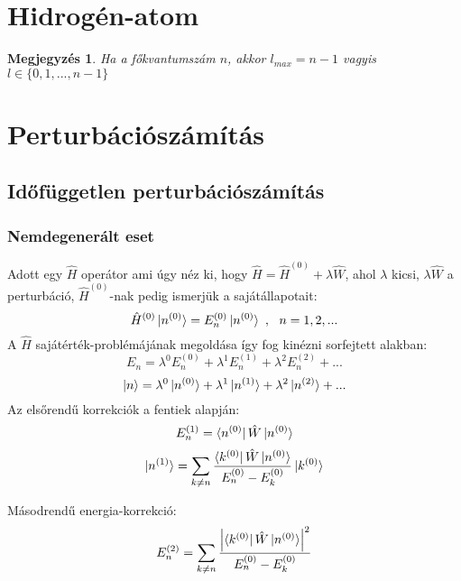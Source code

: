 \documentclass[12pt]{article}
\theoremstyle{plain}
\newtheorem*{megj}{Megjegyzés}
\begin{document}
\section{Hidrogén-atom}
\begin{megj}
    Ha a főkvantumszám $n$, akkor $l_{max}=n-1$ vagyis $l \in \{0,1,...,n-1\}$
\end{megj}
\section{Perturbációszámítás}
\subsection{Időfüggetlen perturbációszámítás}
\subsubsection{Nemdegenerált eset}
Adott egy $\hat H$ operátor ami úgy néz ki, hogy $\hat H = \hat H^{(0)} + \lambda \hat W$, ahol $\lambda$ kicsi, 
$\lambda\hat W$ a perturbáció, $\hat H^{(0)}$-nak pedig ismerjük a sajátállapotait:
\begin{equation}
    \hat H^{(0)} \ket{n^{(0)}} = E_n^{(0)} \ket{n^{(0)}} ~, ~~ n=1,2,... 
\end{equation}
A $\hat H$ sajátérték-problémájának megoldása így fog kinézni sorfejtett alakban:
\begin{equation}
    E_n = \lambda^0 E_n^{(0)} + \lambda^1 E_n^{(1)} + \lambda^2 E_n^{(2)} + ...
\end{equation}
\begin{equation}
  \ket n = \lambda^0 \ket{n^{(0)}} + \lambda^1 \ket{n^{(1)}} + \lambda^2 \ket{n^{(2)}} + ...  
\end{equation}
Az elsőrendű korrekciók a fentiek alapján:
\begin{equation}
    E_n^{(1)} = \bra{n^{(0)}} \hat W \ket{n^{(0)}}      
\end{equation}
\begin{equation}
    \ket{n^{(1)}} = \sum\limits_{k\neq n}\frac{\bra{k^{(0)}} \hat W \ket{n^{(0)}}}{E_n^{(0)}-E_k^{(0)}}
    \ket{k^{(0)}}
\end{equation}

Másodrendű energia-korrekció:
\begin{equation}
    E_n^{(2)} = \sum\limits_{k\neq n}\frac{\left|\bra{k^{(0)}} \hat W \ket{n^{(0)}}\right|^2}{E_n^{(0)}-E_k^{(0)}}    
\end{equation}
\end{document}
